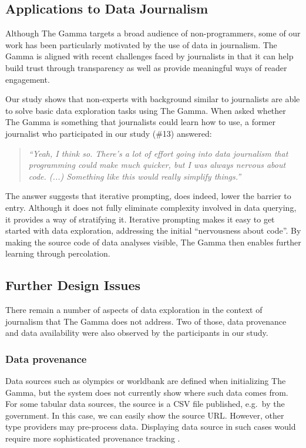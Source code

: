 \documentclass[manuscript,review,anonymous]{acmart}
\newcommand{\ikvd}[1]{{\fontfamily{zi4}\selectfont\small #1}}
\begin{document}
\subsection{Applications to Data Journalism}
Although The Gamma targets a broad audience of non-programmers, some of our work has been
particularly motivated by the use of data in journalism. The Gamma is aligned with recent challenges
faced by journalists in that it can help build trust through transparency as well as provide
meaningful ways of reader engagement.

Our study shows that non-experts with background similar
to journalists are able to solve basic data exploration tasks using The Gamma. When asked whether
The Gamma is something that journalists could learn how to use, a former journalist who
participated in our study (\#13) answered:

\begin{quote}
\emph{``Yeah, I think so. There's a lot of effort going into data journalism that
  programming could make much quicker, but I was always nervous about code. (...)
  Something like this would really simplify things.''}
\end{quote}

\noindent
The answer suggests that iterative prompting, does indeed, lower the barrier to entry. Although it
does not fully eliminate complexity involved in data querying, it provides a way of stratifying
it. Iterative prompting makes it easy to get started with data exploration, addressing the initial
``nervousness about code''. By making the source code of data analyses visible, The Gamma then
enables further learning through percolation.

\subsection{Further Design Issues}
There remain a number of aspects of data exploration in the context of journalism that
The Gamma does not address. Two of those, data provenance and data availability were also
observed by the participants in our study.

\subsubsection*{Data provenance}
Data sources such as \ikvd{olympics} or \ikvd{worldbank} are defined when initializing The Gamma,
but the system does not currently show where such data comes from.
For some tabular data sources, the source is a CSV file published, e.g.~by the government. In this case,
we can easily show the source URL. However, other type providers may pre-process data. Displaying
data source in such cases would require more sophisticated provenance tracking \cite{provenance}.
\end{document}
